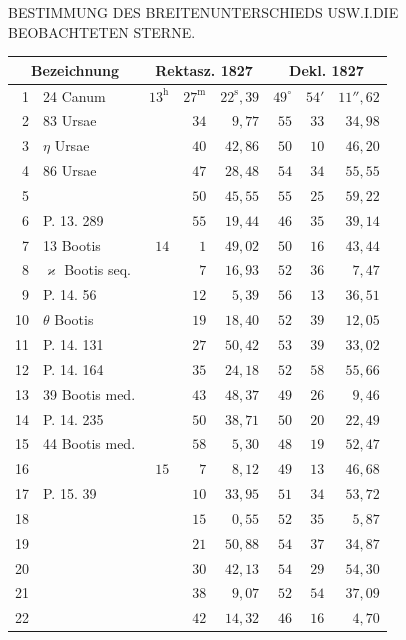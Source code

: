 \clearpage
\noindent\parbox[t]{\dimexpr\textwidth-10mm\relax}{\centering\scriptsize BESTIMMUNG DES BREITENUNTERSCHIEDS USW.\quad I.\quad DIE BEOBACHTETEN STERNE.}\par
\begin{center}
\begin{minipage}[t]{.49\textwidth}\centering
{\scriptsize\setlength{\tabcolsep}{1.2pt}\renewcommand{\arraystretch}{1.2}\begin{tabular}{r|l|rrr|rrr|}
\multicolumn{2}{c|}{Bezeichnung}&\multicolumn{3}{c|}{Rektasz. 1827}&\multicolumn{3}{c|}{Dekl. 1827}\\\hline
1&24 Canum&$13^{\mathrm h}$&$27^{\mathrm m}$&$22^{\mathrm s}{,}39$&$49^\circ$&$54'$&$11''{,}62$\\
2&83 Ursae&&$34$&$9{,}77$&$55$&$33$&$34{,}98$\\
3&$\eta$ Ursae&&$40$&$42{,}86$&$50$&$10$&$46{,}20$\\
4&86 Ursae&&$47$&$28{,}48$&$54$&$34$&$55{,}55$\\
5&&&$50$&$45{,}55$&$55$&$25$&$59{,}22$\\
6&P. 13. 289&&$55$&$19{,}44$&$46$&$35$&$39{,}14$\\
7&13 Bootis&$14$&$1$&$49{,}02$&$50$&$16$&$43{,}44$\\
8&$\varkappa$ Bootis seq.&&$7$&$16{,}93$&$52$&$36$&$7{,}47$\\
9&P. 14. 56&&$12$&$5{,}39$&$56$&$13$&$36{,}51$\\
10&$\theta$ Bootis&&$19$&$18{,}40$&$52$&$39$&$12{,}05$\\
11&P. 14. 131&&$27$&$50{,}42$&$53$&$39$&$33{,}02$\\
12&P. 14. 164&&$35$&$24{,}18$&$52$&$58$&$55{,}66$\\
13&39 Bootis med.&&$43$&$48{,}37$&$49$&$26$&$9{,}46$\\
14&P. 14. 235&&$50$&$38{,}71$&$50$&$20$&$22{,}49$\\
15&44 Bootis med.&&$58$&$5{,}30$&$48$&$19$&$52{,}47$\\
16&&$15$&$7$&$8{,}12$&$49$&$13$&$46{,}68$\\
17&P. 15. 39&&$10$&$33{,}95$&$51$&$34$&$53{,}72$\\
18&&&$15$&$0{,}55$&$52$&$35$&$5{,}87$\\
19&&&$21$&$50{,}88$&$54$&$37$&$34{,}87$\\
20&&&$30$&$42{,}13$&$54$&$29$&$54{,}30$\\
21&&&$38$&$9{,}07$&$52$&$54$&$37{,}09$\\
22&&&$42$&$14{,}32$&$46$&$16$&$4{,}70$\\

\end{tabular}}
\end{minipage}
\end{center}
